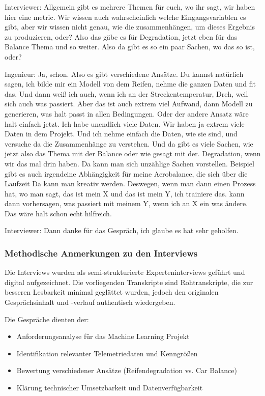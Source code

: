 Interviewer:
Allgemein gibt es mehrere Themen für euch, wo ihr sagt, wir haben hier eine metric. Wir wissen auch wahrscheinlich welche Eingangsvariablen es gibt, aber wir wissen nicht genau, wie die zusammenhängen, um dieses Ergebnis zu produzieren, oder? Also das gäbe es für Degradation, jetzt eben für das Balance Thema und so weiter. Also da gibt es so ein paar Sachen, wo das so ist, oder? 

Ingenieur:
Ja, schon. Also es gibt verschiedene Ansätze. Du kannst natürlich sagen, ich bilde mir ein Modell von dem Reifen, nehme die ganzen Daten und fit das. Und dann weiß ich auch, wenn ich an der Streckentemperatur, Dreh, weil sich auch was passiert. Aber das ist auch extrem viel Aufwand, dann Modell zu generieren, was halt passt in allen Bedingungen. Oder der andere Ansatz wäre halt einfach jetzt. Ich habe unendlich viele Daten. Wir haben ja extrem viele Daten in dem Projekt. Und ich nehme einfach die Daten, wie sie sind, und versuche da die Zusammenhänge zu verstehen. Und  da gibt es viele Sachen, wie jetzt  also das Thema mit der Balance oder wie gesagt mit der. Degradation, wenn wir das mal drin haben. Da kann man sich unzählige Sachen vorstellen. Beispiel gibt es auch irgendeine Abhängigkeit für meine Aerobalance, die sich über die Laufzeit Da kann man kreativ werden. Deswegen, wenn man dann einen Prozess hat, wo man sagt, das ist mein X und das ist mein Y, ich trainiere das.  kann dann vorhersagen, was passiert mit meinem Y, wenn ich an X ein was ändere. Das wäre halt schon echt hilfreich. 

Interviewer: 
Dann danke für das Gespräch, ich glaube es hat sehr geholfen.

\subsubsection{Methodische Anmerkungen zu den Interviews}

Die Interviews wurden als semi-strukturierte Experteninterviews geführt und digital aufgezeichnet. Die vorliegenden Transkripte sind Rohtranskripte, die zur besseren Lesbarkeit minimal geglättet wurden, jedoch den originalen Gesprächsinhalt und -verlauf authentisch wiedergeben.

Die Gespräche dienten der:
\begin{itemize}
    \item Anforderungsanalyse für das Machine Learning Projekt
    \item Identifikation relevanter Telemetriedaten und Kenngrößen
    \item Bewertung verschiedener Ansätze (Reifendegradation vs. Car Balance)
    \item Klärung technischer Umsetzbarkeit und Datenverfügbarkeit
\end{itemize}